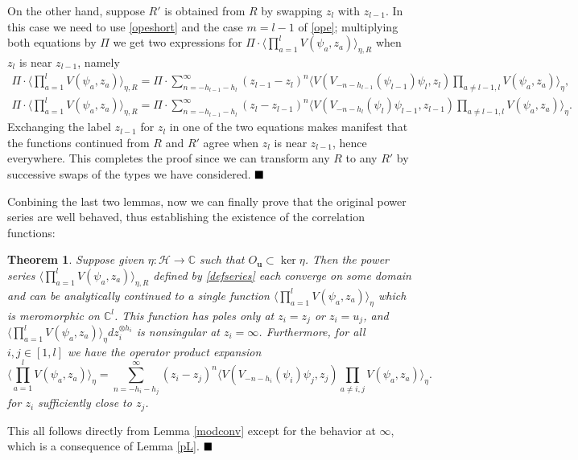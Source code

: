 \documentclass[a4paper,12pt]{article}
\newcommand{\C}{{\mathbb C}}
\newcommand{\uu}{{\mathbf u}}
\newcommand{\F}{{\mathcal H}}
\newcommand{\IP}[1]{\langle#1\rangle}
\newcommand{\done}{$\hfill \hfill \blacksquare$ \bigskip}
\newtheorem{thm}[defn]{Theorem}
\newcommand{\oproof}[1]{\noindent {\bf Proof#1.\ }}
\begin{document}
On the other hand, suppose $R'$ is obtained from $R$ by swapping $z_l$ with $z_{l-1}$.  In this case we need to use \eqref{opeshort} and the case $m=l-1$ of \eqref{ope};
multiplying both equations by $\Pi$ we get two expressions for $\Pi \cdot \IP{\prod_{a=1}^l V(\psi_a, z_a)}_{\eta,R}$ when $z_l$ is near $z_{l-1}$, namely
\begin{gather}
\Pi \cdot \IP{\prod_{a=1}^l V(\psi_a, z_a)}_{\eta,R} = \Pi \cdot \sum_{n = - h_{l-1} - h_l}^\infty (z_{l-1} - z_l)^{n} \IP{V(V_{-n-h_{l-1}}(\psi_{l-1}) \psi_l, z_l) \prod_{a \ne l-1,l} V(\psi_a, z_a)}_\eta, \\
\Pi \cdot \IP{\prod_{a=1}^l V(\psi_a, z_a)}_{\eta,R} = \Pi \cdot \sum_{n = - h_{l-1} - h_l}^\infty (z_{l} - z_{l-1})^{n} \IP{V(V_{-n-h_l}(\psi_l) \psi_{l-1}, z_{l-1}) \prod_{a \ne l-1,l} V(\psi_a, z_a)}_\eta.
\end{gather}
Exchanging the label $z_{l-1}$ for $z_l$ in one of the two equations makes manifest that the functions 
continued from $R$ and $R'$ agree when $z_l$ is near $z_{l-1}$, hence everywhere.
This completes the proof since we can transform any $R$ 
to any $R'$ by successive swaps of the types we have considered. \done

Conbining the last two lemmas, now we can finally prove that the original power series are well behaved, thus
establishing the existence of the correlation functions:

\begin{thm} \label{bigThm} Suppose given $\eta: \F \to \C$ such that $O_\uu \subset \ker \eta$.  Then the power
series $\IP{\prod_{a=1}^l V(\psi_a, z_a)}_{\eta,R}$ defined by \eqref{defseries} each converge on some domain and can be analytically continued to a single
function $\IP{\prod_{a=1}^l V(\psi_a, z_a)}_{\eta}$ which is meromorphic on $\C^l$.  This function has poles only at $z_i = z_j$ or $z_i = u_j$,
and $\IP{\prod_{a=1}^l V(\psi_a, z_a)}_{\eta} dz_i^{\otimes h_i}$ is nonsingular at 
$z_i = \infty$.  Furthermore, for all $i,j \in [1,l]$ we have the operator product expansion
\begin{equation}
\IP{\prod_{a=1}^l V(\psi_a, z_a)}_{\eta} = \sum_{n= - h_i - h_j}^\infty (z_i - z_j)^n \IP{V(V_{-n-h_i}(\psi_i) \psi_j, z_j) \prod_{a \ne i,j} V(\psi_a, z_a)}_\eta.
\end{equation}
for $z_i$ sufficiently close to $z_j$.
\end{thm}
\oproof{} This all follows directly from Lemma \ref{modconv} except for the behavior at $\infty$, which is a consequence of Lemma \ref{pL}. \done
\end{document}
